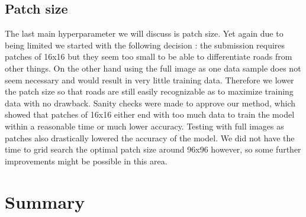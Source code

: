 \documentclass[10pt,conference,compsocconf]{IEEEtran}
\begin{document}
\subsection{Patch size}
The last main hyperparameter we will discuss is patch size. Yet again due to being limited we started with the following decision : the submission requires patches of 16x16 but they seem too small to be able to differentiate roads from other things. On the other hand using the full image as one data sample does not seem necessary and would result in very little training data. Therefore we lower the patch size so that roads are still easily recognizable as to maximize training data with no drawback.
\newline
Sanity checks were made to approve our method, which showed that patches of 16x16 either end with too much data to train the model within a reasonable time or much lower accuracy. Testing with full images as patches also drastically lowered the accuracy of the model. We did not have the time to grid search the optimal patch size around 96x96 however, so some further improvements might be possible in this area.
\section{Summary}



\end{document}
